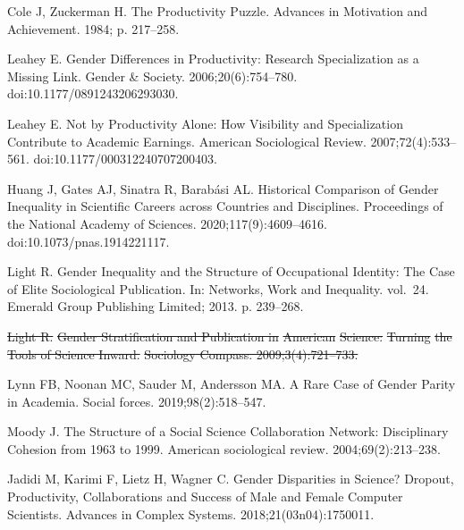 \documentclass[
  10pt,
  letterpaper,
]{article}
\providecommand{\DIFdeltex}[1]{{\protect\color{red}\sout{#1}}}                      %
\providecommand{\DIFdelbegin}{} %
\providecommand{\DIFdelend}{} %
\providecommand{\DIFdel}[1]{\texorpdfstring{\DIFdeltex{#1}}{}} %
\newcommand{\DIFscaledelfig}{0.5}
\newlength{\DIFdelgraphicswidth} %
\newlength{\DIFdelgraphicsheight} %
\newcommand{\DIFdelincludegraphics}[2][]{%
\sbox{\DIFdelgraphicsbox}{\DIFOincludegraphics[#1]{#2}}%
\settoboxwidth{\DIFdelgraphicswidth}{\DIFdelgraphicsbox} %
\settoboxtotalheight{\DIFdelgraphicsheight}{\DIFdelgraphicsbox} %
\scalebox{\DIFscaledelfig}{%
\parbox[b]{\DIFdelgraphicswidth}{\usebox{\DIFdelgraphicsbox}\\[-\baselineskip] \rule{\DIFdelgraphicswidth}{0em}}\llap{\resizebox{\DIFdelgraphicswidth}{\DIFdelgraphicsheight}{%
\setlength{\unitlength}{\DIFdelgraphicswidth}%
\begin{picture}(1,1)%
\thicklines\linethickness{2pt} %
{\color[rgb]{1,0,0}\put(0,0){\framebox(1,1){}}}%
{\color[rgb]{1,0,0}\put(0,0){\line( 1,1){1}}}%
{\color[rgb]{1,0,0}\put(0,1){\line(1,-1){1}}}%
\end{picture}%
}\hspace*{3pt}}} %
} %
\DeclareRobustCommand{\DIFdelbegin}{\DIFOdelbegin \let\includegraphics\DIFdelincludegraphics} %
\DeclareRobustCommand{\DIFdelend}{\DIFOaddend \let\includegraphics\DIFOincludegraphics} %
\begin{document}
\begin{thebibliography}{10}
Cole J, Zuckerman H.
\newblock The {{Productivity Puzzle}}.
\newblock Advances in Motivation and Achievement. 1984; p. 217--258.

Leahey E.
\newblock Gender {{Differences}} in {{Productivity}}: {{Research Specialization}} as a {{Missing Link}}.
\newblock Gender \& Society. 2006;20(6):754--780.
\newblock doi:{10.1177/0891243206293030}.

Leahey E.
\newblock Not by {{Productivity Alone}}: {{How Visibility}} and {{Specialization Contribute}} to {{Academic Earnings}}.
\newblock American Sociological Review. 2007;72(4):533--561.
\newblock doi:{10.1177/000312240707200403}.

Huang J, Gates AJ, Sinatra R, Barab{\'a}si AL.
\newblock Historical Comparison of Gender Inequality in Scientific Careers across Countries and Disciplines.
\newblock Proceedings of the National Academy of Sciences. 2020;117(9):4609--4616.
\newblock doi:{10.1073/pnas.1914221117}.

Light R.
\newblock Gender Inequality and the Structure of Occupational Identity: {{The}} Case of Elite Sociological Publication.
\newblock In: Networks, Work and Inequality. vol.~24. {Emerald Group Publishing Limited}; 2013. p. 239--268.

\DIFdelbegin {}
\DIFdel{Light R.
}%
\DIFdel{Gender Stratification and Publication in }%
\DIFdel{American}%
\DIFdel{Science: }%
\DIFdel{Turning}%
\DIFdel{the Tools of Science Inward.
}%
\DIFdel{Sociology Compass. 2009;3(4):721--733.
}%

\DIFdelend {}
Lynn FB, Noonan MC, Sauder M, Andersson MA.
\newblock A Rare Case of Gender Parity in Academia.
\newblock Social forces. 2019;98(2):518--547.

Moody J.
\newblock The Structure of a Social Science Collaboration Network: {{Disciplinary}} Cohesion from 1963 to 1999.
\newblock American sociological review. 2004;69(2):213--238.

Jadidi M, Karimi F, Lietz H, Wagner C.
\newblock Gender Disparities in Science? {{Dropout}}, Productivity, Collaborations and Success of Male and Female Computer Scientists.
\newblock Advances in Complex Systems. 2018;21(03n04):1750011.


\end{thebibliography}
\end{document}
